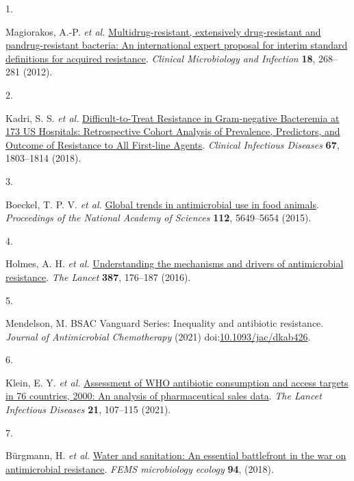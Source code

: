 \documentclass[
]{book}
\newlength{\cslhangindent}
\newlength{\csllabelwidth}
\newlength{\cslentryspacingunit} %
\newenvironment{CSLReferences}[2] %
 {%
  \setlength{\parindent}{0pt}
  \ifodd #1
  \let\oldpar\par
  \def\par{\hangindent=\cslhangindent\oldpar}
  \fi
  \setlength{\parskip}{#2\cslentryspacingunit}
 }%
 {}
\newcommand{\CSLLeftMargin}[1]{\parbox[t]{\csllabelwidth}{#1}}
\newcommand{\CSLRightInline}[1]{\parbox[t]{\linewidth - \csllabelwidth}{#1}\break}
\begin{document}
\hypertarget{refs}{}
\begin{CSLReferences}{0}{0}
\leavevmode{}%
\CSLLeftMargin{1. }
\CSLRightInline{Magiorakos, A.-P. \emph{et al.} \href{https://doi.org/10.1111/j.1469-0691.2011.03570.x}{Multidrug-resistant, extensively drug-resistant and pandrug-resistant bacteria: An international expert proposal for interim standard definitions for acquired resistance}. \emph{Clinical Microbiology and Infection} \textbf{18}, 268--281 (2012).}

\leavevmode{}%
\CSLLeftMargin{2. }
\CSLRightInline{Kadri, S. S. \emph{et al.} \href{https://doi.org/10.1093/cid/ciy378}{Difficult-to-{Treat Resistance} in {Gram}-negative {Bacteremia} at 173 {US Hospitals}: Retrospective {Cohort Analysis} of {Prevalence}, {Predictors}, and {Outcome} of {Resistance} to {All First}-line {Agents}}. \emph{Clinical Infectious Diseases} \textbf{67}, 1803--1814 (2018).}

\leavevmode{}%
\CSLLeftMargin{3. }
\CSLRightInline{Boeckel, T. P. V. \emph{et al.} \href{https://doi.org/10.1073/pnas.1503141112}{Global trends in antimicrobial use in food animals}. \emph{Proceedings of the National Academy of Sciences} \textbf{112}, 5649--5654 (2015).}

\leavevmode{}%
\CSLLeftMargin{4. }
\CSLRightInline{Holmes, A. H. \emph{et al.} \href{https://doi.org/10.1016/S0140-6736(15)00473-0}{Understanding the mechanisms and drivers of antimicrobial resistance}. \emph{The Lancet} \textbf{387}, 176--187 (2016).}

\leavevmode{}%
\CSLLeftMargin{5. }
\CSLRightInline{Mendelson, M. {BSAC Vanguard Series}: Inequality and antibiotic resistance. \emph{Journal of Antimicrobial Chemotherapy} (2021) doi:\href{https://doi.org/10.1093/jac/dkab426}{10.1093/jac/dkab426}.}

\leavevmode{}%
\CSLLeftMargin{6. }
\CSLRightInline{Klein, E. Y. \emph{et al.} \href{https://doi.org/10.1016/S1473-3099(20)30332-7}{Assessment of {WHO} antibiotic consumption and access targets in 76 countries, 2000\textendash 15: An analysis of pharmaceutical sales data}. \emph{The Lancet Infectious Diseases} \textbf{21}, 107--115 (2021).}

\leavevmode{}%
\CSLLeftMargin{7. }
\CSLRightInline{Bürgmann, H. \emph{et al.} \href{https://doi.org/10.1093/femsec/fiy101}{Water and sanitation: An essential battlefront in the war on antimicrobial resistance}. \emph{FEMS microbiology ecology} \textbf{94}, (2018).}


\end{CSLReferences}
\end{document}
